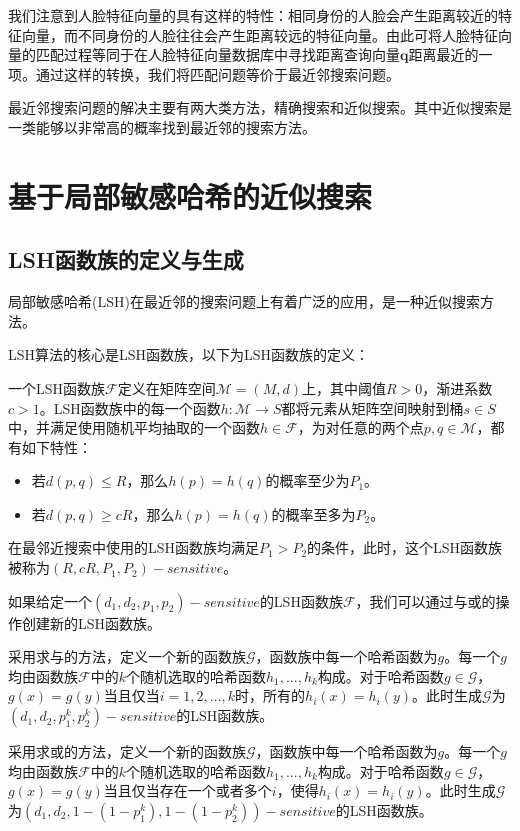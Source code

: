 我们注意到人脸特征向量的具有这样的特性：相同身份的人脸会产生距离较近的特征向量，而不同身份的人脸往往会产生距离较远的特征向量。由此可将人脸特征向量的匹配过程等同于在人脸特征向量数据库中寻找距离查询向量$\mathbf{q}$距离最近的一项。通过这样的转换，我们将匹配问题等价于最近邻搜索问题。

最近邻搜索问题的解决主要有两大类方法，精确搜索和近似搜索。其中近似搜索是一类能够以非常高的概率找到最近邻的搜索方法。

\section{基于局部敏感哈希的近似搜索}

\subsection{LSH函数族的定义与生成}

局部敏感哈希(LSH)在最近邻的搜索问题上有着广泛的应用，是一种近似搜索方法。

LSH算法的核心是LSH函数族，以下为LSH函数族的定义：

一个LSH函数族$\mathcal{F}$定义在矩阵空间$\mathcal{M}=(M,d)$上，其中阈值$R>0$，渐进系数$c>1$。LSH函数族中的每一个函数$h:\mathcal{M}\rightarrow S$都将元素从矩阵空间映射到桶$s\in S$中，并满足使用随机平均抽取的一个函数$h\in \mathcal{F}$，为对任意的两个点$p,q\in \mathcal{M}$，都有如下特性：

\begin{itemize}
	\item 若$d(p,q)\leq R$，那么$h(p)=h(q)$的概率至少为$P_1$。
	\item 若$d(p,q)\geq cR$，那么$h(p)=h(q)$的概率至多为$P_2$。
\end{itemize}

在最邻近搜索中使用的LSH函数族均满足$P_1>P_2$的条件，此时，这个LSH函数族被称为$(R,cR,P_1,P_2)-sensitive$。

如果给定一个$(d_1,d_2,p_1,p_2)-sensitive$的LSH函数族$\mathcal{F}$，我们可以通过与或的操作创建新的LSH函数族。

采用求与的方法，定义一个新的函数族$\mathcal{G}$，函数族中每一个哈希函数为$g$。每一个$g$均由函数族$\mathcal{F}$中的$k$个随机选取的哈希函数$h_1,...,h_k$构成。对于哈希函数$g\in \mathcal{G}$，$g(x)=g(y)$当且仅当$i=1,2,...,k$时，所有的$h_i(x)=h_i(y)$。此时生成$\mathcal{G}$为$(d_1,d_2,p_1^k,p_2^k)-sensitive$的LSH函数族。

采用求或的方法，定义一个新的函数族$\mathcal{G}$，函数族中每一个哈希函数为$g$。每一个$g$均由函数族$\mathcal{F}$中的$k$个随机选取的哈希函数$h_1,...,h_k$构成。对于哈希函数$g\in \mathcal{G}$，$g(x)=g(y)$当且仅当存在一个或者多个$i$，使得$h_i(x)=h_i(y)$。此时生成$\mathcal{G}$为$(d_1,d_2,1-(1-p_1^k),1-(1-p_2^k))-sensitive$的LSH函数族。

